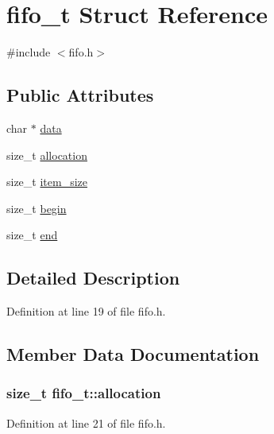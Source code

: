 \hypertarget{structfifo__t}{}\section{fifo\+\_\+t Struct Reference}
\label{structfifo__t}


{\ttfamily \#include $<$fifo.\+h$>$}

\subsection*{Public Attributes}
\begin{DoxyCompactItemize}
\item 
char $\ast$ \hyperlink{structfifo__t_ad806607da2ce373d1ad2e25691a9d069}{data}
\item 
size\+\_\+t \hyperlink{structfifo__t_ac7d75b05a953b3f9fb81f74bde883eb2}{allocation}
\item 
size\+\_\+t \hyperlink{structfifo__t_a9e7b35c08422599daaf97bfc31d7a2a5}{item\+\_\+size}
\item 
size\+\_\+t \hyperlink{structfifo__t_a79f37cde2567dd47b74429ba81d33a5b}{begin}
\item 
size\+\_\+t \hyperlink{structfifo__t_aacc38be66356863026eb2cf5e646526d}{end}
\end{DoxyCompactItemize}


\subsection{Detailed Description}


Definition at line 19 of file fifo.\+h.



\subsection{Member Data Documentation}
\subsubsection[{\texorpdfstring{allocation}{allocation}}]{\setlength{\rightskip}{0pt plus 5cm}size\+\_\+t fifo\+\_\+t\+::allocation}\hypertarget{structfifo__t_ac7d75b05a953b3f9fb81f74bde883eb2}{}\label{structfifo__t_ac7d75b05a953b3f9fb81f74bde883eb2}


Definition at line 21 of file fifo.\+h.

